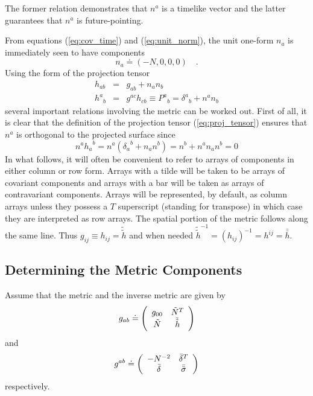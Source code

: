 \documentclass[twocolumn]{article}
\def\.{{\quad .}}
\begin{document}
The former relation demonstrates that $n^a$ is a timelike vector and the
latter guarantees that $n^a$ is future-pointing.

From equations (\ref{eq:cov_time}) and (\ref{eq:unit_norm}), the unit
one-form $n_a$ is immediately seen to have components
\[
   n_a \doteq \left(-N, 0, 0, 0 \right) \.
\]
Using the form of the projection tensor
\begin{eqnarray}\label{eq:proj_tensor}
   h_{ab} & = & g_{ab} + n_{a}n_{b} \nonumber \\
   {h^{a}}_{b} & = &  g^{ac} h_{cb} \equiv {P^{a}}_{b} =
   {\delta^{a}}_{b} + n^{a} n_{b}
\end{eqnarray}
several important relations involving the metric can be worked out.  First of
all, it is clear that the definition of the projection tensor
(\ref{eq:proj_tensor}) ensures that $n^a$ is orthogonal to the projected
surface since
\[
   n^a {h_a}^b = n^a \left( {\delta_a}^b + n_a n^b \right) = n^b + n^a n_a n^b = 0
\]
In what follows, it will often be convenient to refer to arrays of components
in either column or row form.  Arrays with a tilde will be taken to be arrays
of covariant components and arrays with a bar will be taken as arrays of contravariant
components.  Arrays will be represented, by default, as column arrays unless
they possess a $T$ superscript (standing for transpose) in which case they are
interpreted as row arrays.
The spatial portion of the metric follows along the same line.  Thus
$g_{ij} \equiv h_{ij} = {\tilde{\tilde h}}$ and when needed
${\tilde {\tilde h}}^{-1} = \left( h_{ij} \right)^{-1} = h^{ij} =
{\bar {\bar h}}$.


\subsection{Determining the Metric Components}\label{SS:g_comps}

Assume that the metric and the inverse metric are given by
\[
   g_{ab} \doteq
   \left(
     \begin{array}{c c}
       g_{00}     & {\tilde N}^{T} \\
       {\tilde N} & {\tilde {\tilde h}}
     \end{array}
   \right)
\]
and
\[
   g^{ab} \doteq
   \left(
     \begin{array}{c c}
       -N^{-2}        & {\bar \delta}^{T} \\
       {\bar \delta}  & {\bar {\bar \sigma}}
     \end{array}
   \right)
\]
respectively.
\end{document}
